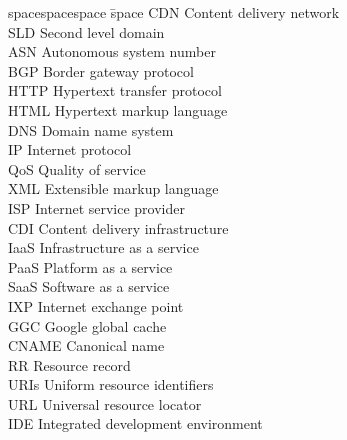 \begin{tabbing}
spacespacespace \= space \kill
CDN 	 \> Content delivery network \\
SLD 	 \> Second level domain \\
ASN	 \> 	Autonomous system number	 \\
BGP 	 \> Border gateway protocol \\
HTTP  \> Hypertext transfer protocol	 \\
HTML  \> Hypertext markup language	 \\
DNS  \> Domain name system	 \\
IP	 \> 	Internet protocol	 \\
QoS	 \> 	Quality of service	 \\
XML	 \> 	Extensible markup language	 \\
ISP	 \> 	Internet service provider	 \\
CDI	 \> 	Content delivery infrastructure	 \\
IaaS	 \> 	Infrastructure as a service	 \\
PaaS	 \> 	Platform as a service	 \\
SaaS	 \> 	Software as a service	 \\
IXP	 \> 	Internet exchange point	 \\
GGC	 \> 	Google global cache	 \\
CNAME	 \> 	Canonical name	 \\
RR	 \> 	Resource record	 \\
URIs	 \> 	Uniform resource identifiers	 \\
URL	 \> 	Universal resource locator	 \\
IDE	 \> 	Integrated development environment	 \\

\end{tabbing}
